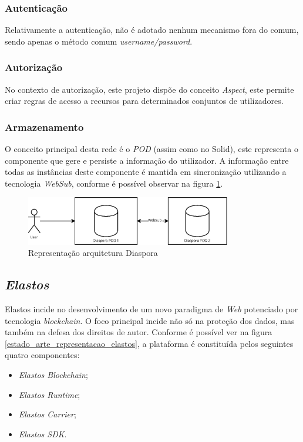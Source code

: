 \subsubsection*{Autenticação}
Relativamente a autenticação, não é adotado nenhum mecanismo fora do comum, sendo apenas o método comum \emph{username/password}.

\subsubsection*{Autorização}
No contexto de autorização, este projeto dispõe do conceito \emph{Aspect}, este permite criar regras de acesso a recursos para determinados conjuntos de utilizadores\cite{diaspora_wiki}.

\subsubsection*{Armazenamento}
O conceito principal desta rede é o \emph{\acrshort{POD}} (assim como no Solid), este representa o componente que gere e persiste a informação do utilizador. A informação entre todas as instâncias deste componente é mantida em sincronização utilizando a tecnologia \emph{WebSub}, conforme é possível observar na figura \ref{estado_arte_representacao_diaspora}\cite{diaspora_wiki}.

\begin{figure}[H]
    \begin{center}
        \includegraphics[width=0.8\textwidth]{figures/estado_arte-Diaspora.eps}
        \caption{Representação arquitetura Diaspora}
        \label{estado_arte_representacao_diaspora}
    \end{center}
\end{figure}

\subsection{\emph{Elastos}}
Elastos incide no desenvolvimento de um novo paradigma de \emph{Web} potenciado por tecnologia \emph{blockchain}\cite{a_bit_about_blockchain}. O foco principal incide não só na proteção dos dados, mas também na defesa dos direitos de autor. Conforme é possível ver na figura \ref{estado_arte_representacao_elastos}, a plataforma é constituída pelos seguintes quatro componentes\cite{elastos_white_paper}:
\begin{itemize}
	\item \emph{Elastos Blockchain};
	\item \emph{Elastos Runtime};
	\item \emph{Elastos Carrier};
	\item \emph{Elastos SDK}.
\end{itemize}

